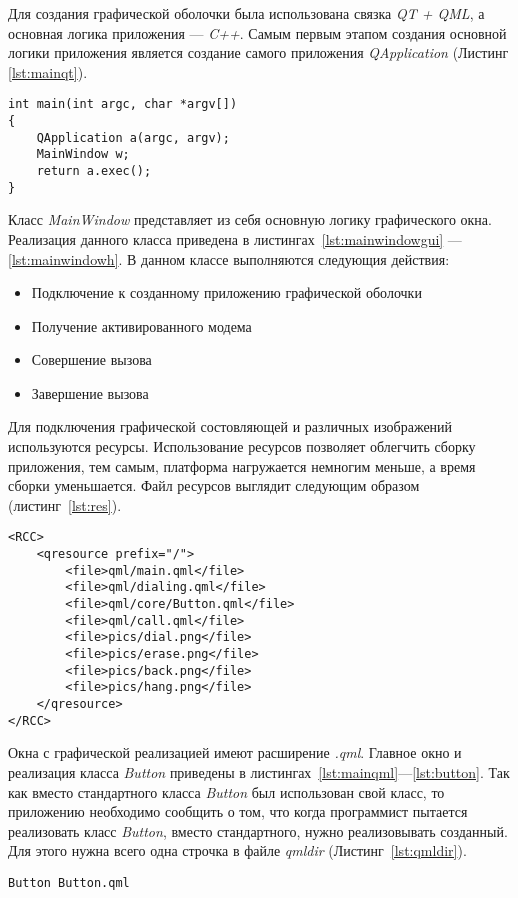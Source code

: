 Для создания графической оболочки была использована связка \textit{QT + QML}, а основная логика приложения --- \textit{C++}. Самым первым этапом создания основной логики приложения является создание самого приложения \textit{QApplication} (Листинг \ref{lst:mainqt}).
\begin{lstlisting}[label=lst:mainqt, caption={Создание приложения}]
int main(int argc, char *argv[])
{
	QApplication a(argc, argv);
	MainWindow w;
	return a.exec();
}
\end{lstlisting}
Класс \textit{MainWindow} представляет из себя основную логику графического окна. Реализация данного класса приведена в листингах~\ref{lst:mainwindowgui} --- \ref{lst:mainwindowh}. В данном классе выполняются следующия действия:
\begin{itemize}
\item Подключение к созданному приложению графической оболочки
\item Получение активированного модема
\item Совершение вызова
\item Завершение вызова
\end{itemize}

Для подключения графической состовляющей и различных изображений используются ресурсы. Использование ресурсов позволяет облегчить сборку приложения, тем самым, платформа нагружается немногим меньше, а время сборки уменьшается. Файл ресурсов выглядит следующим образом (листинг~\ref{lst:res}).
\begin{lstlisting}[label=lst:res, caption={Файл ресурсов}]
<RCC>
	<qresource prefix="/">
		<file>qml/main.qml</file>
		<file>qml/dialing.qml</file>
		<file>qml/core/Button.qml</file>
		<file>qml/call.qml</file>
		<file>pics/dial.png</file>
		<file>pics/erase.png</file>
		<file>pics/back.png</file>
		<file>pics/hang.png</file>
	</qresource>
</RCC>
\end{lstlisting}

Окна с графической реализацией имеют расширение \textit{.qml}. Главное окно и реализация класса \textit{Button} приведены в листингах~\ref{lst:mainqml}---\ref{lst:button}. Так как вместо стандартного класса \textit{Button} был использован свой класс, то приложению необходимо сообщить о том, что когда программист пытается реализовать класс \textit{Button}, вместо стандартного, нужно реализовывать созданный. Для этого нужна всего одна строчка в файле \textit{qmldir} (Листинг~\ref{lst:qmldir}).
\begin{lstlisting}[label=lst:qmldir, caption={Подключение класса Button}]
Button Button.qml
\end{lstlisting}

